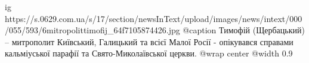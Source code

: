  
 
 
 
 

\ifcmt
  ig https://s.0629.com.ua/s/17/section/newsInText/upload/images/news/intext/000/055/593/6mitropolittimofij_64f7105874426.jpg
  @caption Тимофій (Щербацький) – митрополит Київський, Галицький та всієї Малої Росії - опікувався справами кальміуської парафії та Свято-Миколаївської церкви.
  @wrap center
  @width 0.9
\fi
